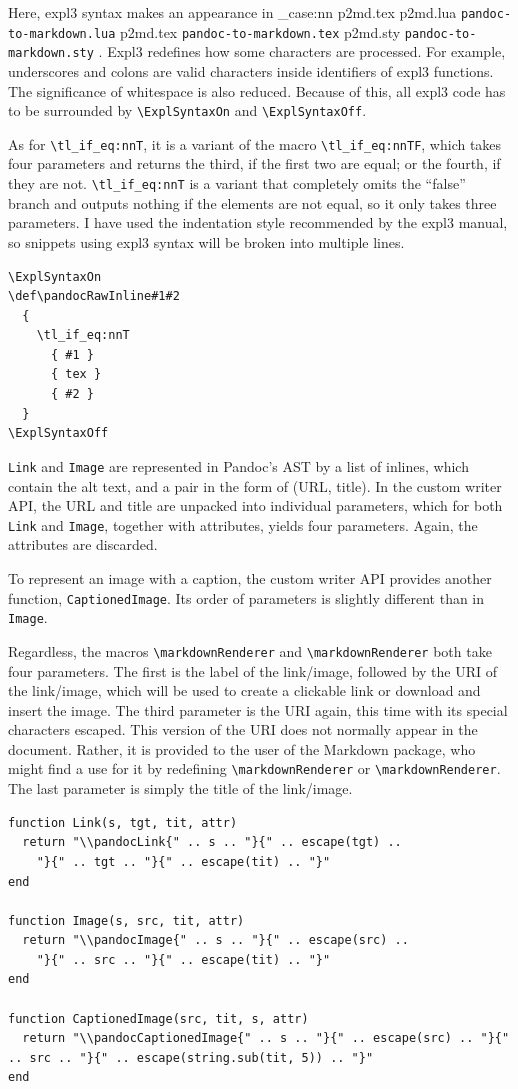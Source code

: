 \documentclass[
  digital,     %
  oneside,     %
  nosansbold,  %
  nocolorbold, %
  lof,         %
  nolot,       %
]{fithesis4}
\newcommand\macro[1]{\texttt{\textbackslash{}{#1}}}
\newcommand\renderer[1]{\macro{markdown\-Renderer\-{#1}}}
\newcommand\file[1]
  {
    \str_case:nn
      { #1 }
      {
        { p2md.lua } { \texttt{pandoc\hyp{}to\hyp{}markdown.lua} }
        { p2md.tex } { \texttt{pandoc\hyp{}to\hyp{}markdown.tex} }
        { p2md.sty } { \texttt{pandoc\hyp{}to\hyp{}markdown.sty} }
      }
  }
\begin{document}
Here, expl3 syntax makes an appearance in \file{p2md.tex}. Expl3 redefines how some characters are processed. For example, underscores and colons are valid characters inside identifiers of expl3 functions. The significance of whitespace is also reduced. Because of this, all expl3 code has to be surrounded by \macro{ExplSyntaxOn} and \macro{ExplSyntaxOff}.

As for \macro{tl\_if\_eq:nnT}, it is a variant of the macro \macro{tl\_if\_eq:nnTF}, which takes four parameters and returns the third, if the first two are equal; or the fourth, if they are not. \macro{tl\_if\_eq:nnT} is a variant that completely omits the ``false'' branch and outputs nothing if the elements are not equal, so it only takes three parameters. I have used the indentation style recommended by the expl3 manual, so snippets using expl3 syntax will be broken into multiple lines.

\noindent
\lstset{language=[plain]TeX}
\begin{lstlisting}
\ExplSyntaxOn
\def\pandocRawInline#1#2
  {
    \tl_if_eq:nnT
      { #1 }
      { tex }
      { #2 }
  }
\ExplSyntaxOff
\end{lstlisting}

\noindent
\texttt{Link} and \texttt{Image} are represented in Pandoc's AST by a list of inlines, which contain the alt text, and a pair in the form of (URL, title). In the custom writer API, the URL and title are unpacked into individual parameters, which for both \texttt{Link} and \texttt{Image}, together with attributes, yields four parameters. Again, the attributes are discarded.

To represent an image with a caption, the custom writer API provides another function, \texttt{CaptionedImage}. Its order of parameters is slightly different than in \texttt{Image}.

Regardless, the macros \renderer{Link} and \renderer{Image} both take four parameters. The first is the label of the link/image, followed by the URI of the link/image, which will be used to create a clickable link or download and insert the image. The third parameter is the URI again, this time with its special characters escaped. This version of the URI does not normally appear in the document. Rather, it is provided to the user of the Markdown package, who might find a use for it by redefining \renderer{Link} or \renderer{Image}.
The last parameter is simply the title of the link/image.

\noindent
\lstset{language=[5.3]Lua}
\begin{lstlisting}
function Link(s, tgt, tit, attr)
  return "\\pandocLink{" .. s .. "}{" .. escape(tgt) ..
    "}{" .. tgt .. "}{" .. escape(tit) .. "}"
end

function Image(s, src, tit, attr)
  return "\\pandocImage{" .. s .. "}{" .. escape(src) ..
    "}{" .. src .. "}{" .. escape(tit) .. "}"
end

function CaptionedImage(src, tit, s, attr)
  return "\\pandocCaptionedImage{" .. s .. "}{" .. escape(src) .. "}{" .. src .. "}{" .. escape(string.sub(tit, 5)) .. "}"
end
\end{lstlisting}
\end{document}

